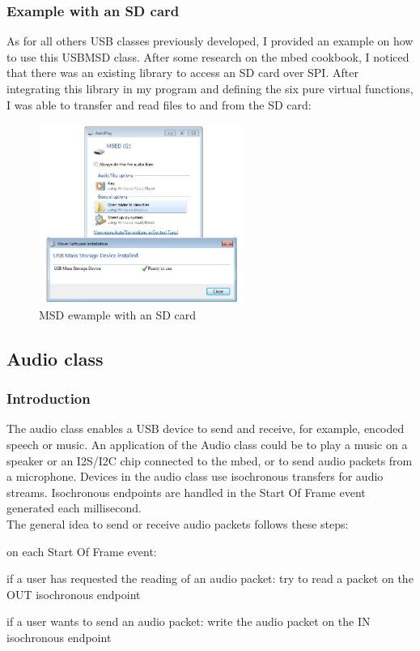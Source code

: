 \documentclass[pdftex,10pt,a4paper]{report}
\newenvironment{packed_item}{
\begin{itemize}
  \setlength{\itemsep}{1pt}
  \setlength{\parskip}{0pt}
  \setlength{\parsep}{0pt}
}{\end{itemize}}
\begin{document}
\subsubsection{Example with an SD card}
As for all others USB classes previously developed, I provided an example on how to use this USBMSD class. After some research on the mbed cookbook, I noticed that there was an existing library to access an SD card over SPI. After integrating this library in my program and defining the six pure virtual functions, I was able to transfer and read files to and from the SD card:

\begin{figure}[h!]
		\centering
		\includegraphics[width=0.6\textwidth]{./msd_windows.jpg}
		\caption{MSD ewample with an SD card}
		\label{MSD ewample with an SD card}
\end{figure}
 


\subsection{Audio class}

\subsubsection{Introduction}
The audio class enables a USB device to send and receive, for example, encoded speech or music. An application of the Audio class could be to play a music on a speaker or an I2S/I2C chip connected to the mbed, or to send audio packets from a microphone. Devices in the audio class use isochronous transfers for audio streams. Isochronous endpoints are handled in the Start Of Frame event generated each millisecond. \\

The general idea to send or receive audio packets follows these steps:
\begin{packed_item}
	\item on each Start Of Frame event:
	\begin{packed_item}
		\item if a user has requested the reading of an audio packet: try to read a packet on the OUT isochronous endpoint
		\item if a user wants to send an audio packet: write the audio packet on the IN isochronous endpoint
	\end{packed_item}
\end{packed_item}
\end{document}
